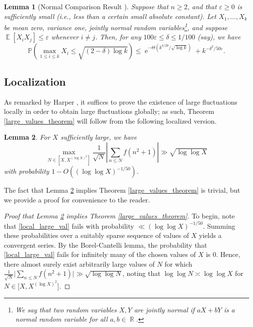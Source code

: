 \documentclass[11pts]{amsart}
\numberwithin{equation}{section}
\newtheorem{lem}{Lemma}[section]
\DeclareMathOperator{\E}{\mathbb{E}}
\DeclareMathOperator{\R}{\mathbb{R}}
\DeclareMathOperator{\e}{e}
\begin{document}
\begin{lem}[Normal Comparison Result \cite{Harper_Fluctuations}] \label{normComparisonLemma} Suppose that $n \geq 2$, and that $\varepsilon \geq 0$ is sufficiently small (i.e., less than a certain small absolute constant). Let $X_1,\dots, X_k$ be
mean zero, variance one, jointly normal random variables\footnote{We say that two random variables $X,Y$ are \textit{jointly normal} if $aX+bY$ is a normal random variable for all $a,b\in\R$.}, and suppose $\E[X_iX_j ]\leq \varepsilon$ whenever $i\neq j$. Then, for any $100\varepsilon \leq \delta \leq 1/100$ (say), we have
\[
\mathbb{P}\left(\max_{1\leq i\leq k} X_i\leq \sqrt{(2-\delta)\log k}\right) \leq  \e^{-\Theta(k^{\delta/20}/\sqrt{\log k})} + k^{-\delta^2/50\varepsilon}.
\]
\end{lem}

\subsection{Localization}

As remarked by Harper \cite[Theorem 2]{Harper_Fluctuations}, it suffices to prove the existence of large fluctuations locally in order to obtain large fluctuations globally; as such, Theorem \ref{large_values_theorem} will follow from the following localized version.

\begin{lem}\label{large_values_lemma}
For $X$ sufficiently large, we have 
\begin{equation}
    \max_{N\in [X, X^{(\log X)^2}]} \frac{1}{\sqrt N}\left\lvert\sum_{n\leq N} f(n^2 + 1)\right\rvert \gg \sqrt{\log\log X}\label{local_large_val}
\end{equation}
with probability $1 - O((\log\log X)^{-1/50})$.
\end{lem}

The fact that Lemma \ref{large_values_lemma} implies Theorem \ref{large_values_theorem} is trivial, but we provide a proof for convenience to the reader. 

\begin{proof} [Proof that Lemma \ref{large_values_lemma} implies Theorem \ref{large_values_theorem}]
    To begin, note that \eqref{local_large_val} fails with probability $\ll (\log\log X)^{-1/50}$. Summing these probabilities over a suitably sparse sequence of values of $X$ yields a convergent series. By the Borel-Cantelli lemma, the probability that \eqref{local_large_val} fails for infinitely many of the chosen values of $X$ is $0$. Hence, there almost surely exist arbitrarily large values of $N$ for which $\frac{1}{\sqrt{N}}\Big|\sum_{n\leq N} f(n^2 + 1)\Big|\gg \sqrt{\log\log N}$, noting that $\log\log N\asymp \log \log X$ for $N\in[X, X^{(\log X)^2}$]. 
\end{proof}
\end{document}

